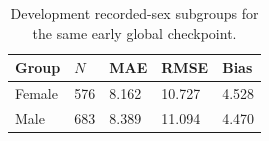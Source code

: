 \begin{table}[!t]
\centering\footnotesize
\caption{Development recorded-sex subgroups for the same early global checkpoint.}
\label{tab:prelim_sex}
\begin{tabularx}{\columnwidth}{@{}p{27mm}XXXX@{}}
\toprule
Group & $N$ & MAE & RMSE & Bias \\
\midrule
Female & 576 & 8.162 & 10.727 & 4.528 \\
Male & 683 & 8.389 & 11.094 & 4.470 \\
\bottomrule
\end{tabularx}
\end{table}